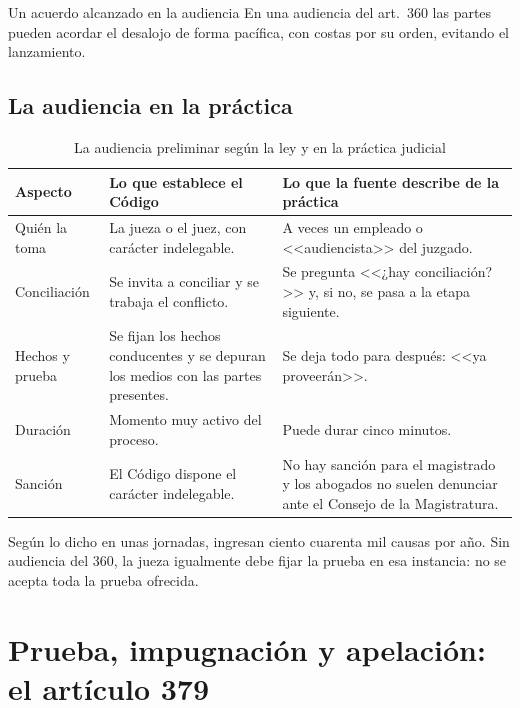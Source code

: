 \documentclass[12pt,oneside]{book}
\begin{document}
\begin{example}{Un acuerdo alcanzado en la audiencia}
En una audiencia del art.\ 360 las partes pueden acordar el desalojo de forma pacífica, con costas por su orden, evitando el lanzamiento.
\end{example}

\subsection{La audiencia en la práctica}

\begin{table}[H]
\centering
\caption{La audiencia preliminar según la ley y en la práctica judicial}
\begin{tabularx}{\textwidth}{>{\raggedright\arraybackslash}p{} >{\raggedright\arraybackslash}X >{\raggedright\arraybackslash}X}
\toprule
\textbf{Aspecto} & \textbf{Lo que establece el Código} & \textbf{Lo que la fuente describe de la práctica} \\
\midrule
Quién la toma & La jueza o el juez, con carácter indelegable. & A veces un empleado o <<audiencista>> del juzgado. \\
Conciliación & Se invita a conciliar y se trabaja el conflicto. & Se pregunta <<¿hay conciliación?>> y, si no, se pasa a la etapa siguiente. \\
Hechos y prueba & Se fijan los hechos conducentes y se depuran los medios con las partes presentes. & Se deja todo para después: <<ya proveerán>>. \\
Duración & Momento muy activo del proceso. & Puede durar cinco minutos. \\
Sanción & El Código dispone el carácter indelegable. & No hay sanción para el magistrado y los abogados no suelen denunciar ante el Consejo de la Magistratura. \\
\bottomrule
\end{tabularx}
\end{table}

Según lo dicho en unas jornadas, ingresan ciento cuarenta mil causas por año. Sin audiencia del 360, la jueza igualmente debe fijar la prueba en esa instancia: no se acepta toda la prueba ofrecida. %

\section{Prueba, impugnación y apelación: el artículo 379}
\end{document}
